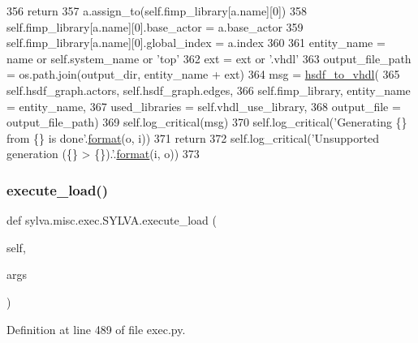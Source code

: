 \begin{DoxyCode}
356           \textcolor{keywordflow}{return}
357         a.assign\_to(self.fimp\_library[a.name][0])
358         self.fimp\_library[a.name][0].base\_actor = a.base\_actor
359         self.fimp\_library[a.name][0].global\_index = a.index
360 
361       entity\_name = name \textcolor{keywordflow}{or} self.system\_name \textcolor{keywordflow}{or} \textcolor{stringliteral}{'top'}
362       ext = ext \textcolor{keywordflow}{or} \textcolor{stringliteral}{'.vhdl'}
363       output\_file\_path = os.path.join(output\_dir, entity\_name + ext)
364       msg = \hyperlink{namespacesylva_1_1code__generation_1_1hsdf__to__vhdl_a0725288caa57a5c518a1b9c2683291fa}{hsdf\_to\_vhdl}(
365         self.hsdf\_graph.actors, self.hsdf\_graph.edges,
366         self.fimp\_library, entity\_name = entity\_name,
367         used\_libraries = self.vhdl\_use\_library,
368         output\_file = output\_file\_path)
369       self.log\_critical(msg)
370       self.log\_critical(\textcolor{stringliteral}{'Generating \{\} from \{\} is done'}.\hyperlink{namespacesylva_1_1examples_1_1hsdfg_ab3510a0b8457362330aa4d9fd2209590}{format}(o, i))
371       \textcolor{keywordflow}{return}
372     self.log\_critical(\textcolor{stringliteral}{'Unsupported generation (\{\} > \{\}).'}.\hyperlink{namespacesylva_1_1examples_1_1hsdfg_ab3510a0b8457362330aa4d9fd2209590}{format}(i, o))
373 
\end{DoxyCode}
\mbox{\label{classsylva_1_1misc_1_1exec_1_1_s_y_l_v_a_ae1fd0355fc0ba1cc2706bc9720347f69}} 
\subsubsection{\texorpdfstring{execute\+\_\+load()}{execute\_load()}}
{\footnotesize\ttfamily def sylva.\+misc.\+exec.\+S\+Y\+L\+V\+A.\+execute\+\_\+load (\begin{DoxyParamCaption}\item[{}]{self,  }\item[{}]{args }\end{DoxyParamCaption})}



Definition at line 489 of file exec.\+py.



